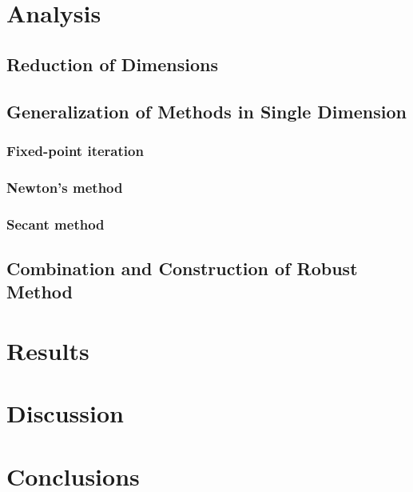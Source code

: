 \section{Analysis}
\subsection{Reduction of Dimensions}




\subsection{Generalization of Methods in Single Dimension}


\subsubsection{Fixed-point iteration}

\subsubsection{Newton's method}

\subsubsection{Secant method}


\subsection{Combination and Construction of Robust Method}




\section{Results}




\section{Discussion}






\section{Conclusions}







